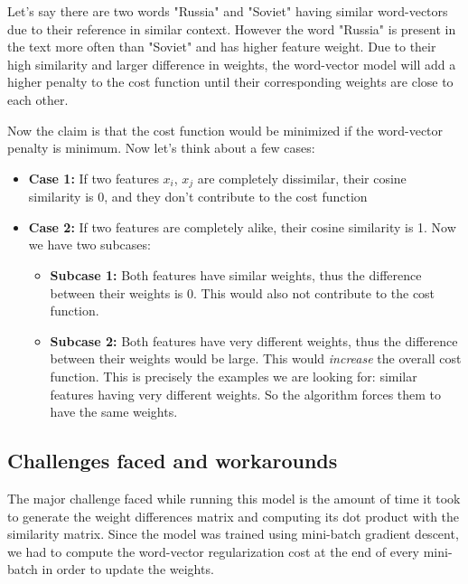 Let's say there are two words "Russia" and "Soviet" having similar word-vectors due to their reference in similar context. However the word "Russia" is present in the text more often than "Soviet" and has higher feature weight. Due to their high similarity and larger difference in weights, the word-vector model will add a higher penalty to the cost function until their corresponding weights are close to each other.

Now the claim is that the cost function would be minimized if the word-vector penalty is minimum. Now let's think about a few cases: 

\begin{itemize}
    \item \textbf{Case 1:} If two features $x_{i}$, $x_{j}$ are completely dissimilar, their cosine similarity is 0, and they don't contribute to the cost function
    \item \textbf{Case 2:} If two features are completely alike, their cosine similarity is 1. Now we have two subcases:
    \begin{itemize}
        \item \textbf{Subcase 1:} Both features have similar weights, thus the difference between their weights is 0. This would also not contribute to the cost function.
        
        \item \textbf{Subcase 2:} Both features have very different weights, thus the difference between their weights would be large. This would \textit{increase} the overall cost function. This is precisely the examples we are looking for: similar features having very different weights. So the algorithm forces them to have the same weights.
    \end{itemize}
\end{itemize}

\subsection{Challenges faced and workarounds}

The major challenge faced while running this model is the amount of time it took to generate the weight differences matrix and computing its dot product with the similarity matrix. Since the model was trained using mini-batch gradient descent, we had to compute the word-vector regularization cost at the end of every mini-batch in order to update the weights. 

